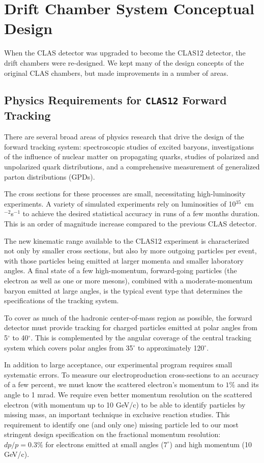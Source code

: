 \section{Drift Chamber System Conceptual Design}

When the CLAS detector was upgraded to become the CLAS12 detector, the
drift chambers were re-designed.  We kept many of the design concepts
of the original CLAS chambers, but made improvements in a number
of areas.

\subsection{Physics Requirements for {\tt CLAS12} Forward Tracking}

There are several broad areas of physics research that drive 
the design of the forward tracking system: 
spectroscopic studies of excited baryons, investigations of 
the influence of nuclear matter on propagating quarks, studies of polarized 
and unpolarized quark distributions, and a comprehensive measurement of 
generalized parton distributions (GPDs). 

The cross sections for these processes are small, necessitating high-luminosity 
experiments.  A variety of simulated experiments rely on luminosities of 
10$^{35}$~cm$^{-2}$s$^{-1}$ to achieve the desired statistical accuracy in 
runs of a few months duration.  This is an order of magnitude increase
compared to the previous CLAS detector.  

The new kinematic range available to the CLAS12 experiment is
characterized not only by smaller cross sections, but also by more outgoing 
particles per event, with those particles being emitted at larger momenta
and smaller laboratory angles.  
A final state of a few high-momentum, forward-going particles (the electron as well as one 
or more mesons), combined with a moderate-momentum baryon emitted at large 
angles, is the typical event type that determines the specifications of the 
tracking system. 

To cover as much of the hadronic center-of-mass region as possible, the forward 
detector must provide tracking for charged particles emitted at polar angles 
from 5$^\circ$ to 40$^\circ$.  This is complemented by the angular coverage of
the central tracking system which covers polar angles from  35$^\circ$ to approximately 120$^\circ$.

In addition to large acceptance, our experimental program requires
small systematic errors.  To measure our electroproduction cross-sections
to an accuracy of a few percent, we must know the scattered electron's
momentum to $1\%$ and its angle to 1 mrad.  
We require even better momentum resolution on the scattered
electron (with momentum up to 10 GeV/c) to be able to identify particles
by missing mass, an important technique in exclusive reaction studies.
This requirement to identify one (and only one) missing particle led to our 
most stringent design specification on the fractional momentum resolution:
$dp/p = 0.3\%$ for electrons emitted at small angles ($7^{\circ}$) and high
momentum (10 GeV/c).  

